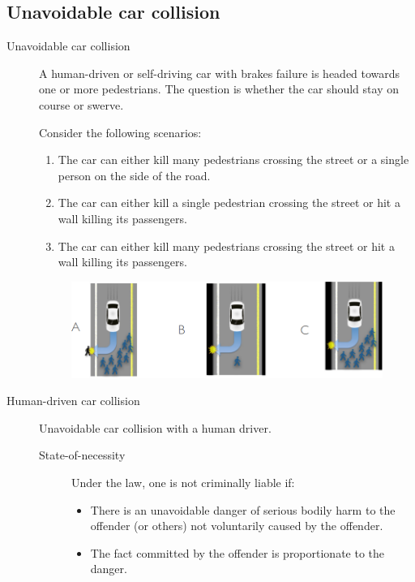 \subsection{Unavoidable car collision}

\begin{description}
    \item[Unavoidable car collision] 
        A human-driven or self-driving car with brakes failure is headed towards one or more pedestrians. The question is whether the car should stay on course or swerve.

        Consider the following scenarios:
        \begin{enumerate}[label=(\Alph*)]
            \item The car can either kill many pedestrians crossing the street or a single person on the side of the road.
            \item The car can either kill a single pedestrian crossing the street or hit a wall killing its passengers.
            \item The car can either kill many pedestrians crossing the street or hit a wall killing its passengers.
        \end{enumerate}

        \begin{figure}[H]
            \centering
            \includegraphics[width=0.8\linewidth]{./img/human_driving_crash.png}
        \end{figure}


    
    \item[Human-driven car collision] 
        Unavoidable car collision with a human driver.

        \begin{description}
            \item[State-of-necessity] 
                Under the law, one is not criminally liable if:
                \begin{itemize}
                    \item There is an unavoidable danger of serious bodily harm to the offender (or others) not voluntarily caused by the offender.
                    \item The fact committed by the offender is proportionate to the danger.
                \end{itemize}
        

\end{description}
\end{description}
